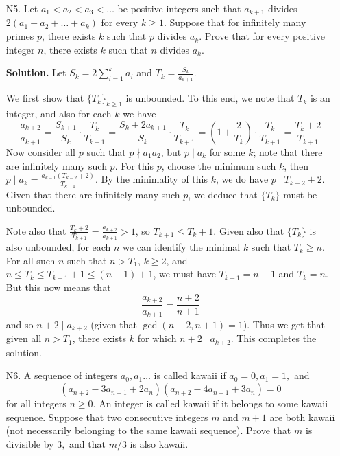 \documentclass[11pt,a4paper]{article}
\begin{document}
\begin{enumerate}
    	\item [N5.]
    	Let $a_1<a_2<a_3<\dots$ be positive integers such that $a_{k+1}$ divides $2(a_1+a_2+\dots+a_k)$ for every $k\geqslant 1$. Suppose that for infinitely many primes $p$, there exists $k$ such that $p$ divides $a_k$. Prove that for every positive integer $n$, there exists $k$ such that $n$ divides $a_k$.
    	
    	\textbf{Solution.} 
    	Let $S_k = 2\sum_{i=1}^k a_i$ and $T_k = \frac{S_k}{a_{k + 1}}$. 
    	
    	We first show that $\{T_k\}_{k\ge 1}$ is unbounded. 
    	To this end, we note that $T_k$ is an integer, 
    	and also for each $k$ we have 
    	\[
    	\frac{a_{k+2}}{a_{k+1}}
    	=\frac{S_{k + 1}}{S_k}\cdot \frac{T_k}{T_{k+1}}
    	=\frac{S_{k} + 2a_{k+1}}{S_k}\cdot \frac{T_k}{T_{k+1}}
    	=(1 + \frac{2}{T_k})\cdot \frac{T_k}{T_{k+1}}
    	=\frac{T_k + 2}{T_{k+1}}
    	\]
    	Now consider all $p$ such that $p\nmid a_1a_2$, 
    	but $p\mid a_k$ for some $k$; 
    	note that there are infinitely many such $p$. 
    	For this $p$, choose the minimum such $k$, 
    	then $p\mid a_k =
    	\frac{a_{k-1}(T_{k-2} + 2)}{T_{k-1}}$. 
    	By the minimality of this $k$, 
    	we do have $p\mid T_{k-2}+2$. 
    	Given that there are infinitely many such $p$, 
    	we deduce that $\{T_k\}$ must be unbounded. 
    	
    	Note also that 
    	$\frac{T_k+2}{T_{k+1}} = \frac{a_{k+2}}{a_{k+1}} > 1$, 
    	so $T_{k + 1}\le T_k + 1$. 
    	Given also that $\{T_k\}$ is also unbounded, 
    	for each $n$ we can identify the minimal $k$ such that $T_k\ge n$. 
    	For all such $n$ such that $n > T_1$, 
    	$k\ge 2$, and $n\le T_k\le T_{k - 1} + 1\le (n - 1) + 1$, 
    	we must have $T_{k-1} = n - 1$ and $T_k = n$. 
    	But this now means that 
    	\[
    	\frac{a_{k+2}}{a_{k+1}}
    	=\frac{n+2}{n + 1}
    	\]
    	and so $n + 2\mid a_{k+2}$ (given that $\gcd(n + 2, n + 1) = 1$). 
    	Thus we get that given all $n > T_1$, 
    	there exists $k$ for which $n + 2\mid a_{k + 2}$. 
    	This completes the solution. 
    	
    	\item [N6.]
    	A sequence of integers $a_0, a_1 …$ is called kawaii if $a_0 =0, a_1=1,$ and$$(a_{n+2}-3a_{n+1}+2a_n)(a_{n+2}-4a_{n+1}+3a_n)=0$$for all integers $n \geq 0$. An integer is called kawaii if it belongs to some kawaii sequence.
    	Suppose that two consecutive integers $m$ and $m+1$ are both kawaii (not necessarily belonging to the same kawaii sequence). Prove that $m$ is divisible by $3,$ and that $m/3$ is also kawaii.
    	

\end{enumerate}
\end{document}
